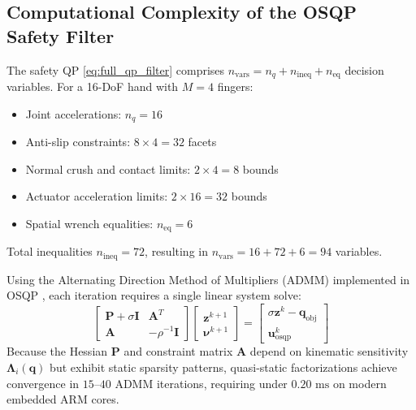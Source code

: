 \subsection{Computational Complexity of the OSQP Safety Filter}
The safety QP \eqref{eq:full_qp_filter} comprises $n_{\text{vars}} = n_q + n_{\text{ineq}} + n_{\text{eq}}$ decision variables. For a 16-DoF hand with $M = 4$ fingers:
\begin{itemize}
    \item Joint accelerations: $n_q = 16$
    \item Anti-slip constraints: $8 \times 4 = 32$ facets
    \item Normal crush and contact limits: $2 \times 4 = 8$ bounds
    \item Actuator acceleration limits: $2 \times 16 = 32$ bounds
    \item Spatial wrench equalities: $n_{\text{eq}} = 6$
\end{itemize}
Total inequalities $n_{\text{ineq}} = 72$, resulting in $n_{\text{vars}} = 16 + 72 + 6 = 94$ variables.

Using the Alternating Direction Method of Multipliers (ADMM) implemented in OSQP \cite{stellato2020osqp}, each iteration requires a single linear system solve:
\begin{equation}
    \begin{bmatrix} \mathbf{P} + \sigma \mathbf{I} & \mathbf{A}^T \\ \mathbf{A} & -\rho^{-1} \mathbf{I} \end{bmatrix} \begin{bmatrix} \mathbf{z}^{k+1} \\ \boldsymbol{\nu}^{k+1} \end{bmatrix} = \begin{bmatrix} \sigma \mathbf{z}^k - \mathbf{q}_{\text{obj}} \\ \mathbf{u}_{\text{osqp}}^k \end{bmatrix}
\end{equation}
Because the Hessian $\mathbf{P}$ and constraint matrix $\mathbf{A}$ depend on kinematic sensitivity $\mathbf{\Lambda}_i(\mathbf{q})$ but exhibit static sparsity patterns, quasi-static factorizations achieve convergence in $15\text{--}40$ ADMM iterations, requiring under $0.20\text{ ms}$ on modern embedded ARM cores.

